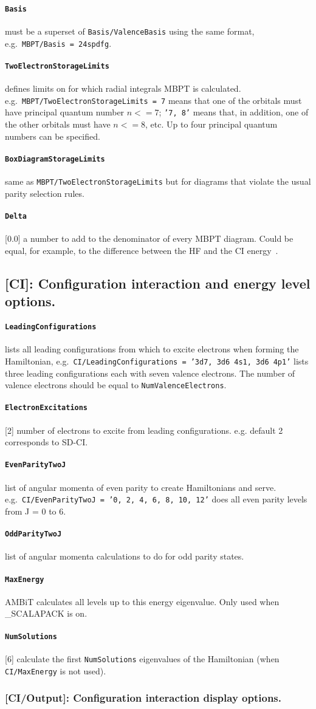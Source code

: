 \documentclass[a4paper,11pt]{article}
\newcommand{\option}[1]{\paragraph{\texttt{#1}}}
\begin{document}
\option{Basis} must be a superset of \texttt{Basis/ValenceBasis} using the same format, e.g.~\texttt{MBPT/Basis = 24spdfg}.

\option{TwoElectronStorageLimits} defines limits on for which radial integrals MBPT is calculated. e.g.~\texttt{MBPT/TwoElectronStorageLimits = 7} means that one of the orbitals must have principal quantum number $n <= 7$; \texttt{'7, 8'} means that, in addition, one of the other orbitals must have $n <= 8$, etc. Up to four principal quantum numbers can be specified.

\option{BoxDiagramStorageLimits} same as \texttt{MBPT/TwoElectronStorageLimits} but for diagrams that violate the usual parity selection rules.

\option{Delta} [0.0] a number to add to the denominator of every MBPT diagram. Could be equal, for example, to the difference between the HF and the CI energy~\cite{kozlov99os,berengut08jpb}.

\subsection*{[CI]: Configuration interaction and energy level options.}
\option{LeadingConfigurations} lists all leading configurations from which to excite electrons when forming the Hamiltonian, e.g.~\texttt{CI/LeadingConfigurations = '3d7, 3d6 4s1, 3d6 4p1'} lists three leading configurations each with seven valence electrons. The number of valence electrons should be equal to \texttt{NumValenceElectrons}.

\option{ElectronExcitations} [2] number of electrons to excite from leading configurations. e.g. default 2 corresponds to SD-CI.

\option{EvenParityTwoJ} list of angular momenta of even parity to create Hamiltonians and serve. e.g.~\texttt{CI/EvenParityTwoJ = '0, 2, 4, 6, 8, 10, 12'} does all even parity levels from J = 0 to 6.

\option{OddParityTwoJ} list of angular momenta calculations to do for odd parity states.

\option{MaxEnergy} AMBiT calculates all levels up to this energy eigenvalue. Only used when \_SCALAPACK is on.
\option{NumSolutions} [6] calculate the first \texttt{NumSolutions} eigenvalues of the Hamiltonian (when \texttt{CI/MaxEnergy} is not used).

\subsubsection{[CI/Output]: Configuration interaction display options.}
\end{document}
